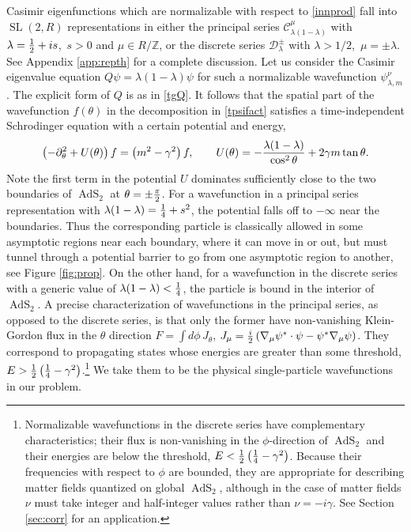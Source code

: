 \documentclass[11pt]{article}
\newcommand{\be}{\begin{equation}}
\newcommand{\ee}{\end{equation}}
\newcommand{\lt}{\left}
\newcommand{\rt}{\right}
\newcommand{\calC}{\mathcal{C}}
\newcommand{\calD}{\mathcal{D}}
\newcommand{\ZZ}{\mathbb{Z}}
\newcommand{\RR}{\mathbb{R}}
\DeclareMathOperator{\tSL}{\widetilde{\mathrm{SL}}}
\DeclareMathOperator{\tAdS}{\widetilde{AdS}}
\newcommand{\tht}{\theta}
\newcommand{\lam}{\lambda}
\newcommand{\ga}{\gamma}
\newcommand{\ov}{\over}
\newcommand{\p}{\partial}
\def\widetilde#1{#1}%
\def\RR{R}
\begin{document}
Casimir eigenfunctions which are normalizable with respect to \eqref{innprod} fall into $\tSL(2,\RR)$ representations in either the principal series $\calC^{\mu}_{\lam(1-\lam)}$ with $\lambda={1 \ov 2}+i s$,\, $s>0$ and $\mu \in \RR/\ZZ$, or the discrete series $\calD_{\lambda}^{\pm}$ with $\lambda>1/2$,\, $\mu=\pm \lam$.\label{princdiscr} See Appendix \ref{app:repth} for a complete discussion. Let us consider the Casimir eigenvalue equation $Q \psi=\lambda(1-\lambda)\psi$ for such a normalizable wavefunction $\psi^{\nu}_{\lambda,m}$. The explicit form of $Q$ is as in \eqref{tgQ}. It follows that the spatial part of the wavefunction $f(\tht)$ in the decomposition in \eqref{tpsifact} satisfies a time-independent Schrodinger equation with a certain potential and energy,
\be \label{pot}
\left( -\p_\tht^2 + U(\tht)\right)f = \left(m^2-\ga^2\right)f, \qquad U(\tht)=-{\lambda(1-\lambda)\ov \cos^2 \tht} + 2 \ga m \tan \tht.
\ee
Note the first term in the potential $U$ dominates sufficiently close to the two boundaries of $\tAdS_2$ at $\tht=\pm{\pi \ov 2}$. For a wavefunction in a principal series representation with $\lam(1-\lam)={1 \ov 4}+s^2$, the potential falls off to $-\infty$ near the boundaries. Thus the corresponding particle is classically allowed in some asymptotic regions near each boundary, where it can move in or out, but must tunnel through a potential barrier to go from one asymptotic region to another, see Figure \ref{fig:prop}. On the other hand, for a wavefunction in the discrete series with a generic value of $\lam(1-\lam)<{1 \ov 4}$, the particle is bound in the interior of $\tAdS_2$. A precise characterization of wavefunctions in the principal series, as opposed to the discrete series, is that only the former have non-vanishing Klein-Gordon flux in the $\tht$ direction $F=\int d\phi\,  J_{\tht}$, $J_{\mu}={i \ov 2}\left(\nabla_\mu \psi^*  \cdot \psi -  \psi^* \nabla_\mu \psi\right)$. They correspond to propagating states whose energies are greater than some threshold, $E > {1 \ov 2}\lt({1 \ov 4}-\ga^2\rt)$.\footnote{Normalizable wavefunctions in the discrete series have complementary characteristics; their flux is non-vanishing in the $\phi$-direction of $\tAdS_2$ and their energies are below the threshold, $E <{1 \ov 2}\lt( {1 \ov 4}-\ga^2\rt)$. Because their frequencies with respect to $\phi$ are bounded, they are appropriate for describing matter fields quantized on global $\tAdS_2$, although in the case of matter fields $\nu$ must take integer and half-integer values rather than $\nu=-i \ga$. See Section \ref{sec:corr} for an application.\label{ftn:discf}} We take them to be the physical single-particle wavefunctions in our problem. 
\end{document}
